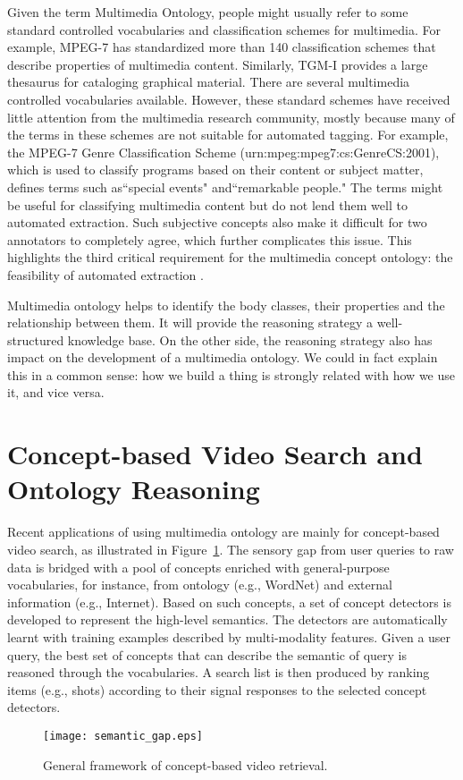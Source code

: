 Given the term Multimedia Ontology, people might usually refer to
some standard controlled vocabularies and classification schemes for
multimedia. For example, MPEG-7 has standardized more than 140
classification schemes that describe properties of multimedia
content. Similarly, TGM-I provides a large thesaurus for cataloging
graphical material. There are several multimedia controlled
vocabularies available. However, these standard schemes have
received little attention from the multimedia research community,
mostly because many of the terms in these schemes are not suitable
for automated tagging. For example, the MPEG-7 Genre Classification
Scheme (urn:mpeg:mpeg7:cs:GenreCS:2001), which is used to classify
programs based on their content or subject matter, defines terms
such as``special events" and``remarkable people." The terms might be
useful for classifying multimedia content but do not lend them well
to automated extraction. Such subjective concepts also make it
difficult for two annotators to completely agree, which further
complicates this issue. This highlights the third critical
requirement for the multimedia concept ontology: the feasibility of
automated extraction \cite{Milind.Naphade:IEEEMM:2006}.

Multimedia ontology helps to identify the body classes, their
properties and the relationship between them. It will provide the
reasoning strategy a well-structured knowledge base. On the other
side, the reasoning strategy also has impact on the development of a
multimedia ontology. We could in fact explain this in a common
sense: how we build a thing is strongly related with how we use it,
and vice versa.

\section{Concept-based Video Search and Ontology Reasoning}
Recent applications of using multimedia ontology are mainly for
concept-based video search, as illustrated in
Figure~\ref{fg-semantic_gap}.
%
The sensory gap from user queries to raw data is bridged with a pool
of concepts enriched with general-purpose vocabularies, for
instance, from ontology (e.g., WordNet) and external information
(e.g., Internet). Based on such concepts, a set of concept detectors
is developed to represent the high-level semantics. The detectors
are automatically learnt with training examples described by
multi-modality features. Given a user query, the best set of
concepts that can describe the semantic of query is reasoned through
the vocabularies. A search list is then produced by ranking items
(e.g., shots) according to their signal responses to the selected
concept detectors.
%
\begin{figure}[t]
\centering
\texttt{[image: semantic\_gap.eps]}
\caption{General framework of concept-based video retrieval.}
\label{fg-semantic_gap}
\end{figure}
%


